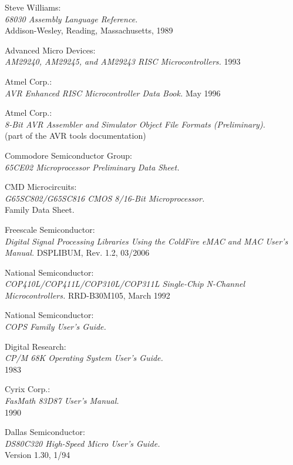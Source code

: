  Steve Williams: \\
		{\em 68030 Assembly Language Reference.\/} \\
		Addison-Wesley, Reading, Massachusetts, 1989

 Advanced Micro Devices: \\
		{\em AM29240, AM29245, and AM29243 RISC Microcontrollers.\/} 1993

 Atmel Corp.: \\
		{\em AVR Enhanced RISC Microcontroller Data Book.\/} May 1996

 Atmel Corp.: \\
		{\em 8-Bit AVR Assembler and Simulator Object File
		Formats (Preliminary).\/} \\
		(part of the AVR tools documentation)

 Commodore Semiconductor Group: \\
		{\em 65CE02 Microprocessor Preliminary Data Sheet.}

 CMD Microcircuits: \\
		{\em G65SC802/G65SC816 CMOS 8/16-Bit Microprocessor.\/} \\
		Family Data Sheet.

 Freescale Semiconductor: \\
		{\em Digital Signal Processing Libraries Using the ColdFire
		eMAC and MAC User's Manual.\/}
		DSPLIBUM, Rev. 1.2, 03/2006

 National Semiconductor: \\
		{\em COP410L/COP411L/COP310L/COP311L
		Single-Chip N-Channel Microcontrollers.\/}
		RRD-B30M105, March 1992

 National Semiconductor: \\
		{\em COPS Family User's Guide.\/}

 Digital Research: \\
		{\em CP/M 68K Operating System User's Guide.\/} \\
		1983

 Cyrix Corp.: \\
		{\em FasMath 83D87 User's Manual.\/} \\
		1990

 Dallas Semiconductor: \\
		{\em DS80C320 High-Speed Micro User's Guide.\/} \\
		Version 1.30, 1/94

